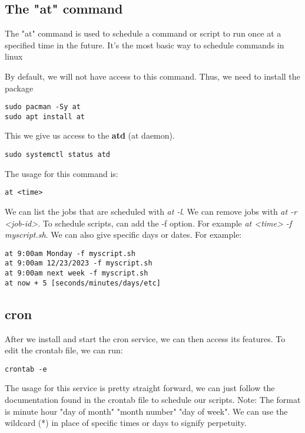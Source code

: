 \documentclass{report}
\begin{document}
    \subsection{The "at" command}
    \bigbreak \noindent 
    \begin{concept}
        The "at" command is used to schedule a command or script to run once at a specified time in the future. It's the most basic way to schedule commands in linux
    \end{concept}
    \bigbreak \noindent 
    By default, we will not have access to this command. Thus, we need to install the package
    \bigbreak \noindent 
    \begin{verbatim}
sudo pacman -Sy at
sudo apt install at
    \end{verbatim}
    \bigbreak \noindent 
    This we give us access to the \textbf{atd} (at daemon).
    \bigbreak \noindent 
    \begin{verbatim}
sudo systemctl status atd  
    \end{verbatim}
    \bigbreak \noindent 
    The usage for this command is:
    
    \begin{verbatim}
at <time>
    \end{verbatim}
    \bigbreak \noindent
    
    \bigbreak \noindent 
    We can list the jobs that are scheduled with \textit{at -l}. We can remove jobs with \textit{at -r <job-id>}. To schedule scripts, can add the -f option. For example \textit{at <time> -f myscript.sh}. 
    \bigbreak \noindent 
    We can also give specific days or dates. For example:
    \begin{verbatim}
at 9:00am Monday -f myscript.sh
at 9:00am 12/23/2023 -f myscript.sh
at 9:00am next week -f myscript.sh
at now + 5 [seconds/minutes/days/etc]
    \end{verbatim}
    \bigbreak \noindent
    
    \pagebreak \bigbreak \noindent 
    \subsection{cron}
    \bigbreak \noindent 
    After we install and start the cron service, we can then access its features. To edit the crontab file, we can run:
    \begin{verbatim}
crontab -e
    \end{verbatim}
    \bigbreak \noindent 
    The usage for this service is pretty straight forward, we can just follow the documentation found in the crontab file to schedule our scripts.
    \bigbreak \noindent 
    Note: The format is minute hour "day of month" "month number" "day of week". We can use the wildcard (*) in place of specific times or days to signify perpetuity.
\end{document}
